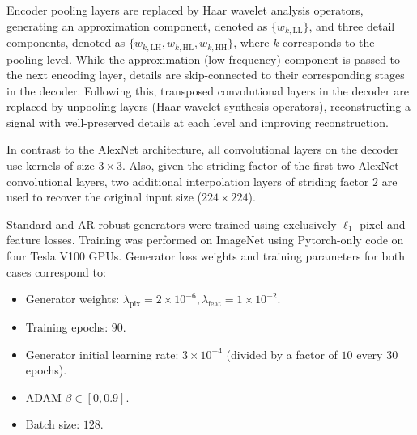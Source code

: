    Encoder pooling layers are replaced by Haar wavelet analysis operators, generating an approximation component, denoted as $\{w_{k, \text{LL}}\}$, and three detail components, denoted as $\{w_{k, \text{LH}}, w_{k, \text{HL}}, w_{k, \text{HH}}\}$, where $k$ corresponds to the pooling level. While the approximation (low-frequency) component is passed to the next encoding layer, details are skip-connected to their corresponding stages in the decoder. Following this, transposed convolutional layers in the decoder are replaced by unpooling layers (Haar wavelet synthesis operators), reconstructing a signal with well-preserved details at each level and improving reconstruction.
    
    In contrast to the AlexNet architecture, all convolutional layers on the decoder use kernels of size $3 \times 3$. Also, given the striding factor of the first two AlexNet convolutional layers, two additional interpolation layers of striding factor $2$ are used to recover the original input size ($224 \times 224$).
    
    Standard and AR robust generators were trained using exclusively $\ell_{1}$ pixel and feature losses. Training was performed on ImageNet using Pytorch-only code on four Tesla V100 GPUs. Generator loss weights and training parameters for both cases correspond to:
    \begin{itemize}
     \setlength\itemsep{0.1\baselineskip}
        \item Generator weights: $\lambda_{\text{pix}}=2\times 10^{-6}, \lambda_{\text{feat}}=1\times 10^{-2}$.
        \item Training epochs: $90$.
        \item Generator initial learning rate: $3\times 10^{-4}$ (divided by a factor of $10$ every $30$ epochs).
        \item ADAM $\beta\in [0, 0.9]$.
        \item Batch size: $128$.
    \end{itemize}
    
    
